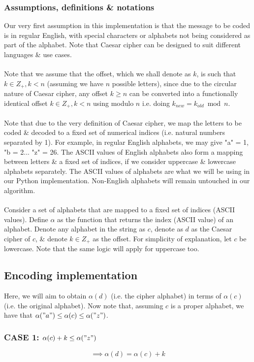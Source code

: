 \subsubsection{Assumptions, definitions \& notations}
Our very first assumption in this implementation is that the message to be coded is in regular English, with special characters or alphabets not being considered as part of the alphabet. Note that Caesar cipher can be designed to suit different languages \& use cases.
\\~\\
Note that we assume that the offset, which we shall denote as $k$, is such that $k \in Z_+, k < n$ (assuming we have $n$ possible letters), since due to the circular nature of Caesar cipher, any offset $k \geq n$ can be converted into a functionally identical offset $k \in Z_+, k < n$ using modulo $n$ i.e. doing $k_{new}=k_{old} \bmod n$.
\\~\\
Note that due to the very definition of Caesar cipher, we map the letters to be coded \& decoded to a fixed set of numerical indices (i.e. natural numbers separated by 1). For example, in regular English alphabets, we may give "a" = 1, "b = 2... "z" = 26. The ASCII values of English alphabets also form a mapping between letters \& a fixed set of indices, if we consider uppercase \& lowercase alphabets separately. The ASCII values of alphabets are what we will be using in our Python implementation. Non-English alphabets will remain untouched in our algorithm.
\\~\\
Consider a set of alphabets that are mapped to a fixed set of indices (ASCII values). Define $\alpha$ as the function that returns the index (ASCII value) of an alphabet. Denote any alphabet in the string as $c$, denote as $d$ as the Caesar cipher of $c$, \& denote $k \in Z_+$ as the offset. For simplicity of explanation, let $c$ be lowercase. Note that the same logic will apply for uppercase too.

\subsection{Encoding implementation}
Here, we will aim to obtain $\alpha(d)$ (i.e. the cipher alphabet) in terms of $\alpha(c)$ (i.e. the original alphabet). Now note that, assuming $c$ is a proper alphabet, we have that $\alpha("a") \leq \alpha(c) \leq \alpha("z")$.

\subsubsection{CASE 1: $\alpha(c)+k \leq \alpha("z")$}
\begin{equation} \label{caesarCipherEncodingEq1} \implies \alpha(d) = \alpha(c)+k \end{equation}

